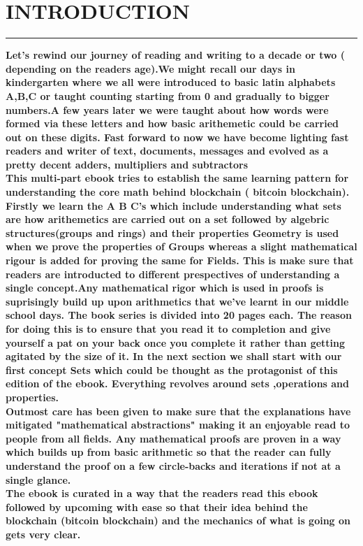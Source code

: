 \documentclass{article}
\begin{document}
\section * {INTRODUCTION}
\hrule 
\bigskip
\textbf{Let's rewind our journey of reading and writing to a decade or two ( depending on the readers age).We might recall our days in kindergarten where we all were introduced to basic latin alphabets A,B,C or taught counting 
    starting from 0 and gradually to bigger numbers.A few years later we were taught about how words were formed via these letters and how basic arithemetic could be carried out on these digits. Fast forward to now we have become lighting fast readers and writer of  text, documents, messages and evolved as a pretty decent adders, multipliers and subtractors 
}
\\
\textbf{This multi-part ebook tries to establish the same learning pattern for understanding the core math behind blockchain ( bitcoin blockchain). Firstly we learn the A B C's which include understanding what sets are how arithemetics are carried out on a set followed by algebric structures(groups and rings)  and their properties 
Geometry is used when we prove the properties of Groups whereas a slight mathematical rigour is added for proving the same for Fields. This is make sure that readers are introducted to different prespectives of understanding a single concept.Any  mathematical rigor which is used in proofs  is suprisingly  build up upon arithmetics that we've learnt in our middle school days. The book series is divided into 20 pages each. The reason for doing this is to ensure that you read it to completion and give yourself a pat on your back once you complete it rather than getting agitated by the size of it.
In the next section we shall start with our first concept Sets which could be thought as the protagonist of this edition of the ebook. Everything revolves around sets ,operations and properties.
}
\\
\textbf{ Outmost care has been given to make sure that the explanations have mitigated  "mathematical abstractions" making it an enjoyable read to people from all fields. Any mathematical proofs are proven in a way which builds up from basic arithmetic so that the reader can fully understand the proof on a few circle-backs and iterations if not at a single glance. }
\\
\textbf {The ebook is curated in a way that the readers read this ebook followed by upcoming with ease  so that their idea behind the blockchain (bitcoin blockchain) and the mechanics of what is going on gets very clear.}
\\
\pagebreak
\end{document}
